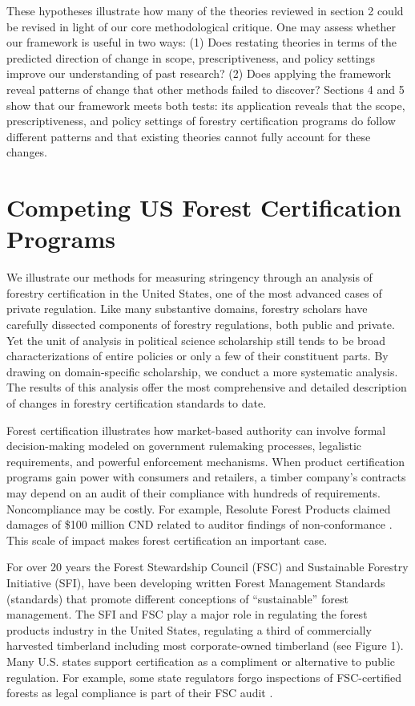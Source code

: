 \documentclass[
      12pt,
            Review ]{article}
\begin{document}
These hypotheses illustrate how many of the theories reviewed in section
2 could be revised in light of our core methodological critique. One may
assess whether our framework is useful in two ways: (1) Does restating
theories in terms of the predicted direction of change in scope,
prescriptiveness, and policy settings improve our understanding of past
research? (2) Does applying the framework reveal patterns of change that
other methods failed to discover? Sections 4 and 5 show that our
framework meets both tests: its application reveals that the scope,
prescriptiveness, and policy settings of forestry certification programs
do follow different patterns and that existing theories cannot fully
account for these changes.

\section{Competing US Forest Certification
Programs}\label{competing-us-forest-certification-programs}

We illustrate our methods for measuring stringency through an analysis
of forestry certification in the United States, one of the most advanced
cases of private regulation. Like many substantive domains, forestry
scholars have carefully dissected components of forestry regulations,
both public and private. Yet the unit of analysis in political science
scholarship still tends to be broad characterizations of entire policies
or only a few of their constituent parts. By drawing on domain-specific
scholarship, we conduct a more systematic analysis. The results of this
analysis offer the most comprehensive and detailed description of
changes in forestry certification standards to date.

Forest certification illustrates how market-based authority can involve
formal decision-making modeled on government rulemaking processes,
legalistic requirements, and powerful enforcement mechanisms. When
product certification programs gain power with consumers and retailers,
a timber company's contracts may depend on an audit of their compliance
with hundreds of requirements. Noncompliance may be costly. For example,
Resolute Forest Products claimed damages of \$100 million CND related to
auditor findings of non-conformance \citep{Tigar2017}. This scale of
impact makes forest certification an important case.

For over 20 years the Forest Stewardship Council (FSC) and Sustainable
Forestry Initiative (SFI), have been developing written Forest
Management Standards (standards) that promote different conceptions of
``sustainable'' forest management. The SFI and FSC play a major role in
regulating the forest products industry in the United States, regulating
a third of commercially harvested timberland including most
corporate-owned timberland (see Figure 1). Many U.S. states support
certification as a compliment or alternative to public regulation. For
example, some state regulators forgo inspections of FSC-certified
forests as legal compliance is part of their FSC audit
\citep{Judge-Lord2013}.
\end{document}
